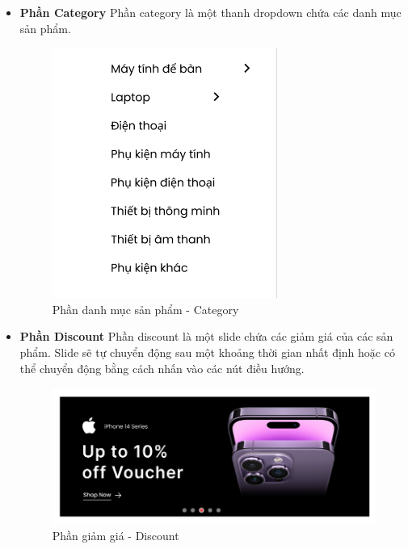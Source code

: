 \begin{itemize}
    \item \textbf{Phần Category}
    \newline
    Phần category là một thanh dropdown chứa các danh mục sản phẩm.
    \begin{figure}[H]
        \begin{center}
        \includegraphics[scale=1]{images/hieu/chap-4/category.png}
        \vspace*{5mm}
        \caption{Phần danh mục sản phẩm - Category}
        \end{center}
    \end{figure}
    \item \textbf{Phần Discount}
    \newline
    Phần discount là một slide chứa các giảm giá của các sản phẩm. Slide sẽ tự chuyển động sau một khoảng thời gian nhất định hoặc có thể chuyển động bằng cách nhấn vào các nút điều hướng.
    \begin{figure}[H]
        \begin{center}
        \includegraphics[scale=0.7]{images/hieu/chap-4/discount.png}
        \vspace*{5mm}
        \caption{Phần giảm giá - Discount}
        \end{center}

\end{figure}
\end{itemize}
